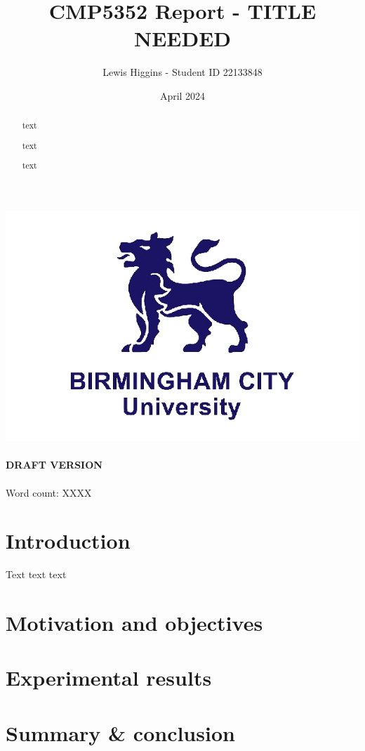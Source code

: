 \documentclass[12pt]{report}
\title{CMP5352 Report - TITLE NEEDED}
\author{Lewis Higgins - Student ID 22133848}
\date{April 2024}
\begin{document}
    \pagecolor{yellow} %

    \makeatletter
    \begin{titlepage}
        \begin{center}
            \includegraphics[width=0.7\linewidth]{bcu logo}\\[4ex]
            {\large \bfseries  \@title }\\[2ex]
            {\large \bfseries  DRAFT VERSION }\\[2ex]
            {\@author}\\[30ex]
            {Word count: XXXX}\\[20ex]
        \end{center}
    \end{titlepage}
    \makeatother
    \thispagestyle{empty}
    \newpage

    \pagecolor{white}

    \begin{abstract}
        text

        text

        text

    \end{abstract}

    \setcounter{page}{0} %

    \tableofcontents
    \thispagestyle{empty}


    \setcounter{page}{0} %

    \chapter*{Introduction}\label{ch:introduction}

    Text text text

    \chapter*{Motivation and objectives}\label{ch:sec1}
    

    \chapter*{Experimental results}\label{ch:sec2}
    

    \chapter*{Summary \& conclusion}\label{ch:sec3}
    
\end{document}
